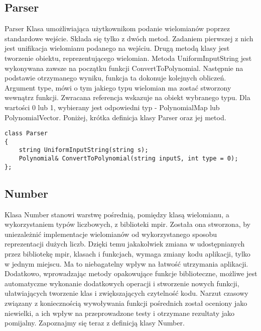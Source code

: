 \documentclass[twoside,a4paper]{book}
\begin{document}
\subsection{Parser}
Parser
Klasa umożliwiająca użytkownikom podanie wielomianów poprzez standardowe wejście. Składa się tylko z dwóch metod. Zadaniem pierwszej z nich jest unifikacja wielomianu podanego na wejściu. Drugą metodą klasy jest tworzenie obiektu, reprezentującego wielomian. Metoda UniformInputString jest wykonywana zawsze na początku funkcji ConvertToPolynomial. Następnie na podstawie otrzymanego wyniku, funkcja ta dokonuje kolejnych obliczeń. Argument type, mówi o tym jakiego typu wielomian ma zostać stworzony wewnątrz funkcji. Zwracana referencja wskazuje na obiekt wybranego typu. Dla wartości 0 lub 1, wybierany jest odpowiedni typ - PolynomialMap lub PolynomialVector. Poniżej, krótka definicja klasy Parser oraz jej metod.

\begin{lstlisting}
class Parser
{
	string UniformInputString(string s);
	Polynomial& ConvertToPolynomial(string inputS, int type = 0);
};
\end{lstlisting}


\subsection{Number}
Klasa Number stanowi warstwę pośrednią, pomiędzy klasą wielomianu, a wykorzystaniem typów liczbowych, z biblioteki mpir. Została ona stworzona, by uniezależnić implementacje wielomianów od wykorzystanego sposobu reprezentacji dużych liczb. Dzięki temu jakakolwiek zmiana w udostępnianych przez bibliotekę mpir, klasach i funkcjach, wymaga zmiany kodu aplikacji, tylko w jednym miejscu. Ma to niebagatelny wpływ na łatwość utrzymania aplikacji. Dodatkowo, wprowadzając metody opakowujące funkcje biblioteczne, możliwe jest automatyczne wykonanie dodatkowych operacji i stworzenie nowych funkcji, ułatwiających tworzenie klas i zwiększających czytelność kodu. Narzut czasowy związany z koniecznością wywoływania funkcji pośrednich został oceniony jako niewielki, a ich wpływ na przeprowadzone testy i otrzymane rezultaty jako pomijalny. Zapoznajmy się teraz z definicją klasy Number.
\end{document}

